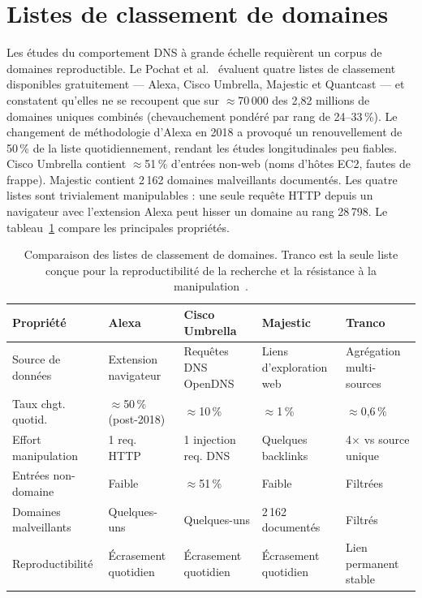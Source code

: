 \section{Listes de classement de domaines}
\label{sec:2.6}

Les études du comportement DNS à grande échelle requièrent un corpus de domaines reproductible. Le Pochat et al.~\cite{LePochat2019} évaluent quatre listes de classement disponibles gratuitement --- Alexa, Cisco Umbrella, Majestic et Quantcast --- et constatent qu'elles ne se recoupent que sur $\approx$70\,000 des 2,82 millions de domaines uniques combinés (chevauchement pondéré par rang de 24--33\,\%). Le changement de méthodologie d'Alexa en 2018 a provoqué un renouvellement de 50\,\% de la liste quotidiennement, rendant les études longitudinales peu fiables. Cisco Umbrella contient $\approx$51\,\% d'entrées non-web (noms d'hôtes EC2, fautes de frappe). Majestic contient 2\,162 domaines malveillants documentés. Les quatre listes sont trivialement manipulables : une seule requête HTTP depuis un navigateur avec l'extension Alexa peut hisser un domaine au rang 28\,798. Le tableau~\ref{tab:ranking_lists} compare les principales propriétés.

\begin{table}[tp]
\centering
\small
\begin{tabularx}{\linewidth}{p{2.2cm} X X X X}
\toprule
\textbf{Propriété} & \textbf{Alexa} & \textbf{Cisco Umbrella} & \textbf{Majestic} & \textbf{Tranco} \\
\midrule
Source de données  & Extension navigateur & Requêtes DNS OpenDNS & Liens d'exploration web & Agrégation multi-sources \\
Taux chgt. quotid. & $\approx$50\,\% (post-2018) & $\approx$10\,\% & $\approx$1\,\% & $\approx$0,6\,\% \\
Effort manipulation & 1 req. HTTP & 1 injection req. DNS & Quelques backlinks & 4$\times$ vs source unique \\
Entrées non-domaine & Faible & $\approx$51\,\% & Faible & Filtrées \\
Domaines malveillants & Quelques-uns & Quelques-uns & 2\,162 documentés & Filtrés \\
Reproductibilité   & Écrasement quotidien & Écrasement quotidien & Écrasement quotidien & Lien permanent stable \\
\bottomrule
\end{tabularx}
\caption{Comparaison des listes de classement de domaines. Tranco est la seule liste conçue pour la reproductibilité de la recherche et la résistance à la manipulation~\cite{LePochat2019}.}
\label{tab:ranking_lists}
\end{table}

